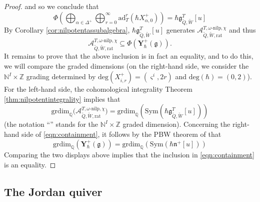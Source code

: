 \documentclass{amsart}
\def\fg{{\mathfrak{g}}}
\def\fn{{\mathfrak{n}}}
\def\BQ{{\mathbb{Q}}}
\def\BZ{{\mathbb{Z}}}
\def\bs{\boldsymbol{\varsigma}}
\def\nn{{\mathbb{N}^I}}
\def\tbps{\mathfrak{g}^T_{\tilde{Q},\tilde{W}}}
\begin{document}
\begin{proof}
and so we conclude that 
$$
\Phi \left(\bigoplus_{\alpha \in \Delta^+} \bigoplus_{r = 0}^{\infty} \text{ad}_T^r(\hbar X^+_{\alpha,0})\right) = \hbar \tbps[u]
$$ 
By Corollary \ref{cor:nilpotentassubalgebra}, $\hbar \tbps[u]$ generates $\mathcal{A}^{T,\omega\text{-nilp},\chi}_{\tilde{Q},\tilde{W},\mathrm{rat}}$ and thus \begin{equation}
\label{eqn:containment}
\mathcal{A}^{T,\omega\text{-nilp},\chi}_{\tilde{Q},\tilde{W},\mathrm{rat}} \subseteq  \Phi(\mathbf{Y}^+_{\hbar}(\fg)).
\end{equation}
It remains to prove that the above inclusion is in fact an equality, and to do this, we will compare the graded dimensions (on the right-hand side, we consider the $\nn \times \BZ$ grading determined by $\mathrm{deg}(X^+_{i,r}) = (\bs^i, 2r)$ and $\mathrm{deg}(\hbar) = (0,2)$). For the left-hand side, the cohomological integrality Theorem \ref{thm:nilpotentintegrality} implies that
\[ 
\text{grdim}_{\BQ}\Big( \mathcal{A}^{T,\omega\text{-nilp},\chi}_{\tilde{Q},\tilde{W},\mathrm{rat}}  \Big)  = \text{grdim}_{\BQ} \left( \text{Sym} \left( \hbar \tbps[u]\right) \right)
\]
(the notation ``'' stands for the $\nn \times \BZ$ graded dimension). Concerning the right-hand side of \eqref{eqn:containment}, it follows by the PBW theorem of \cite[Proposition 5.2]{CWendl} that 
\[ 
\text{grdim}_{\BQ}\left(\mathbf{Y}^+_{\hbar}(\fg)\right) =  \text{grdim}_{\BQ} \left( \text{Sym} \left( \hbar \fn^+[u]\right) \right)
\]
Comparing the two displays above implies that the inclusion in \eqref{eqn:containment} is an equality. \end{proof}

\medskip 

\subsection{The Jordan quiver}
\label{sub:jordan quiver}
\end{document}
